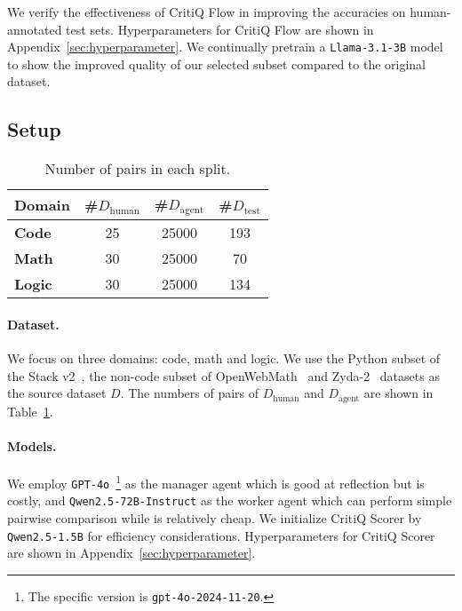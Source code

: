We verify the effectiveness of CritiQ Flow in improving the accuracies on human-annotated
test sets. Hyperparameters for CritiQ Flow are
shown in Appendix~\ref{sec:hyperparameter}. We continually pretrain a \texttt{Llama-3.1-3B}
model to show the improved quality of our selected subset compared to the
original dataset.

\subsection{Setup}

\begin{table}[htbp]
    \centering
    \begin{tabular}{lccc}
        \toprule \textbf{Domain} & \#$D_{\text{human}}$ & \#$D_{\text{agent}}$ & \#$D_{\text{test}}$ \\
        \midrule \textbf{Code}   & 25                   & 25000                & 193                 \\
        \textbf{Math}            & 30                   & 25000                & 70                  \\
        \textbf{Logic}           & 30                   & 25000                & 134                 \\
        \bottomrule
    \end{tabular}
    \caption{Number of pairs in each split.}
    \label{tab:number_dataset_pairs}
\end{table}

\paragraph{Dataset.}

We focus on three domains: code, math and logic. We use the Python subset of the
Stack v2~\citep{lozhkov_starcoder_2024}, the non-code subset of OpenWebMath~\citep{paster_openwebmath_2023}
and Zyda-2~\citep{tokpanov_zyda-2_2024} datasets as the source dataset $D$. The
numbers of pairs of $D_{\text{human}}$ and $D_{\text{agent}}$ are shown in Table~\ref{tab:number_dataset_pairs}.

\paragraph{Models.}
We employ \texttt{GPT-4o}~\footnote{The specific version is \texttt{gpt-4o-2024-11-20}.}
as the manager agent which is good at reflection but is costly, and \texttt{Qwen2.5-72B-Instruct}
as the worker agent which can perform simple pairwise comparison while is
relatively cheap. We initialize CritiQ Scorer by \texttt{Qwen2.5-1.5B} for
efficiency considerations. Hyperparameters for CritiQ Scorer are shown in Appendix~\ref{sec:hyperparameter}.

